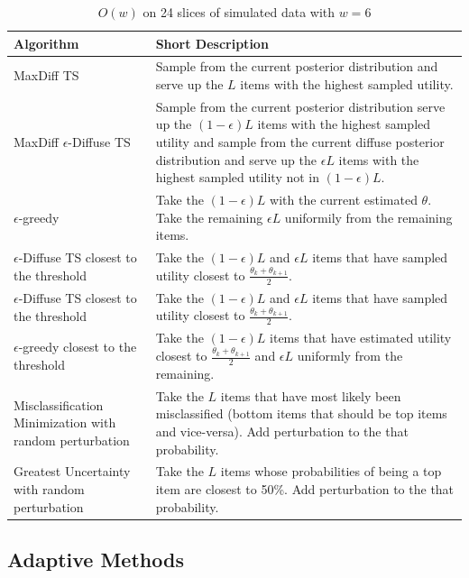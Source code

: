 \documentclass[nonblindrev]{informs3}
\begin{document}
\begin{table}[ht]
\caption{$O(w)$ on 24 slices of simulated data with $w=6$}
\begin{tabular}{p{5cm}|p{11cm}}
Algorithm & Short Description \\
\hline
MaxDiff TS & Sample from the current posterior distribution and serve up the $L$ items with the highest sampled utility.\\
MaxDiff $\epsilon$-Diffuse TS & Sample from the current posterior distribution serve up the $(1-\epsilon)L$ items with the highest sampled utility and sample from the current diffuse posterior distribution and serve up the $\epsilon L$ items with the highest sampled utility not in $(1-\epsilon)L$.\\
$\epsilon$-greedy & Take the $(1-\epsilon)L$ with the current estimated $\theta$. Take the remaining $\epsilon L$ uniformily from the remaining items.\\
$\epsilon$-Diffuse TS closest to the threshold & Take the $(1-\epsilon)L$ and  $\epsilon L$ items that have sampled utility closest to $\frac{\theta_k+\theta_{k+1}}{2}$.\\
$\epsilon$-Diffuse TS closest to the threshold & Take the $(1-\epsilon)L$ and  $\epsilon L$ items that have sampled utility closest to $\frac{\theta_k+\theta_{k+1}}{2}$.\\
$\epsilon$-greedy closest to the threshold & Take the $(1-\epsilon)L$ items that have estimated utility closest to $\frac{\theta_k+\theta_{k+1}}{2}$ and $\epsilon L$ uniformly from the remaining.\\
Misclassification Minimization with random perturbation& Take the $L$ items that have most likely been misclassified (bottom items that should be top items and vice-versa). Add perturbation to the that probability.\\
Greatest Uncertainty with random perturbation& Take the $L$ items whose probabilities of being a top item are closest to 50\%. Add perturbation to the that probability.\\

\end{tabular}
\label{methods}
\end{table}

\subsection{Adaptive Methods}
\end{document}
